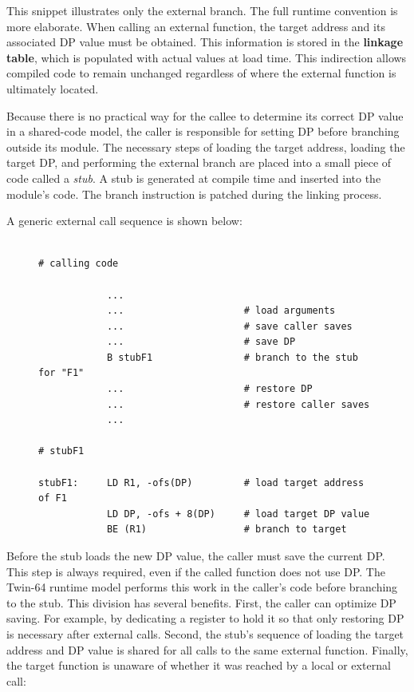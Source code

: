 This snippet illustrates only the external branch. The full runtime convention is more elaborate. When calling an external function, the target address and its associated DP value must be obtained. This information is stored in the \textbf{linkage table}, which is populated with actual values at load time. This indirection allows compiled code to remain unchanged regardless of where the external function is ultimately located.

Because there is no practical way for the callee to determine its correct DP value in a shared-code model, the caller is responsible for setting DP before branching outside its module. The necessary steps of loading the target address, loading the target DP, and performing the external branch are placed into a small piece of code called a \emph{stub}. A stub is generated at compile time and inserted into the module's code. The branch instruction is patched during the linking process.

A generic external call sequence is shown below:

\begin{figure}[H]
\centering
\lstset{style=codesnippetstyle}
\begin{lstlisting}

# calling code

			...
            ...						# load arguments
			...						# save caller saves
			...						# save DP
			B stubF1				# branch to the stub for "F1"
			...					    # restore DP
			...						# restore caller saves
			...
			
# stubF1

stubF1:		LD R1, -ofs(DP)		    # load target address of F1
			LD DP, -ofs + 8(DP)     # load target DP value
			BE (R1)					# branch to target

\end{lstlisting}
\end{figure}


Before the stub loads the new DP value, the caller must save the current DP. This step is always required, even if the called function does not use DP. The Twin-64 runtime model performs this work in the caller's code before branching to the stub. This division has several benefits. First, the caller can optimize DP saving. For example, by dedicating a register to hold it so that only restoring DP is necessary after external calls. Second, the stub's sequence of loading the target address and DP value is shared for all calls to the same external function. Finally, the target function is unaware of whether it was reached by a local or external call:

